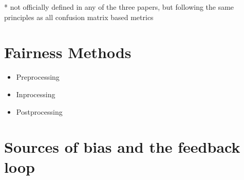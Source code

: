 \documentclass[11pt,a4paper]{article}
\begin{document}
* not officially defined in any of the three papers, but following the same principles as all confusion matrix based metrics

\section{Fairness Methods}
\begin{itemize}
    \item Preprocessing
    \item Inprocessing
    \item Postprocessing
\end{itemize}

\section{Sources of bias and the feedback loop}

\end{document}
